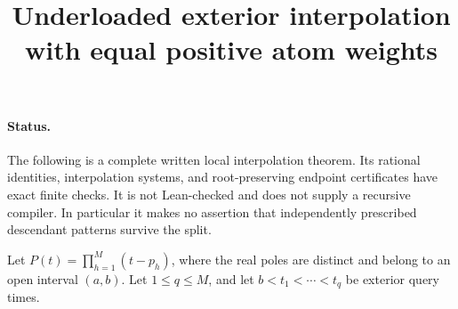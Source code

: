 \documentclass[11pt]{article}
\title{Underloaded exterior interpolation with equal positive atom weights}
\author{}\date{}
\begin{document}
\maketitle

\paragraph{Status.}
The following is a complete written local interpolation theorem. Its
rational identities, interpolation systems, and root-preserving endpoint
certificates have exact finite checks. It is not Lean-checked and does not
supply a recursive compiler. In particular it makes no assertion that
independently prescribed descendant patterns survive the split.

Let $P(t)=\prod_{h=1}^M(t-p_h)$, where the real poles are distinct and
belong to an open interval $(a,b)$. Let $1\leq q\leq M$, and let
$b<t_1<\cdots<t_q$ be exterior query times.
\end{document}
